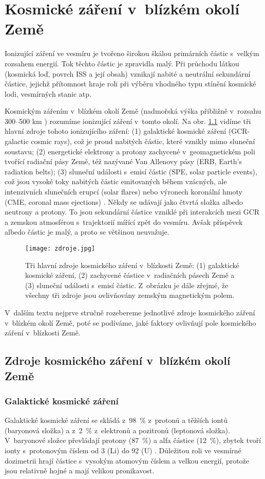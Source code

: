 \chapter{Kosmické záření v~blízkém okolí Země}
Ionizující záření ve vesmíru je tvořeno širokou škálou primárních částic s~velkým rozsahem energií. Tok těchto částic je zpravidla malý. Při průchodu látkou (kosmická loď, povrch ISS a její obsah) vznikají nabité a neutrální sekundární částice, jejichž přítomnost hraje roli při výběru vhodného typu stínění kosmické lodi, vesmírných stanic atp.   

Kosmickým zářením v~blízkém okolí Země (nadmořská výška přibližně v~rozsahu 300--500 km \cite{japonsky}) rozumíme ionizující záření v~tomto okolí. Na obr. \ref{fig:zdroje} vidíme tři hlavní zdroje tohoto ionizujícího záření: (1) galaktické kosmické záření (GCR-galactic cosmic rays), což je proud nabitých částic, které vznikly mimo sluneční soustavu; (2) energetické elektrony a protony zachycené v~geomagnetickém poli tvořící radiační pásy Země, též nazývané Van Allenovy pásy (ERB, Earth's radiation belts); (3) sluneční události s~emisí částic (SPE, solar particle events), což jsou vysoké toky nabitých částic emitovaných během vzácných, ale intenzivních slunečních erupcí (solar flares) nebo výronech koronální hmoty (CME, coronal mass ejections) \cite{benton}. Někdy se udávají jako čtvrtá
složka albedo neutrony a protony. To jsou sekundární částice vzniklé při interakcích mezi GCR a zemskou atmosférou s~trajektorií mířící zpět do vesmíru. Avšak příspěvek albedo částic je malý, a proto se většinou neuvažuje.

\begin{figure}[ht]
  \centering
  \texttt{[image: zdroje.jpg]}
  \caption{Tři hlavní zdroje kosmického záření v~blízkosti Země: (1) galaktické kosmické záření, (2) zachycené částice v~radiačních pásech Země a (3) sluneční události s~emisí částic. Z~obrázku je dále zřejmé, že všechny tři zdroje jsou ovlivňovány zemským magnetickým polem. \cite{benton}}
  \label{fig:zdroje}
\end{figure}

V~dalším textu nejprve stručně rozebereme jednotlivé zdroje kosmického záření v~blízkém okolí Země, poté se podíváme, jaké faktory ovlivňují pole kosmického záření v~blízkosti Země.
\section{Zdroje kosmického záření v~blízkém okolí Země}
\subsection{Galaktické kosmické záření}
Galaktické kosmické záření se skládá z~98~\% z~protonů a těžších iontů (baryonová složka) a z~2~\% z~elektronů a pozitronů (leptonová složka). V~baryonové složce převládají protony (87~\%) a alfa částice (12~\%), zbytek tvoří ionty s~protonovým číslem od 3 (Li) do 92 (U) \cite{benton}. Důležitou roli ve vesmírné dozimetrii hrají částice s~vysokým atomovým číslem a velkou energií, protože jsou relativně hojné a mají velikou pronikavost.

